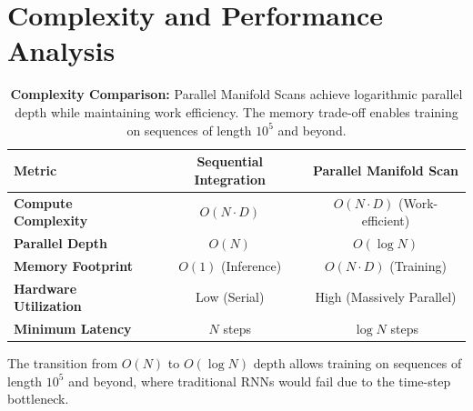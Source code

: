 \documentclass[12pt,a4paper]{article}
\begin{document}
\section{Complexity and Performance Analysis}

\begin{table}[htbp]
\centering
\begin{tabular}{@{}lcc@{}}
\toprule
\textbf{Metric} & \textbf{Sequential Integration} & \textbf{Parallel Manifold Scan} \\
\midrule
\textbf{Compute Complexity} & $O(N \cdot D)$ & $O(N \cdot D)$ (Work-efficient) \\
\textbf{Parallel Depth} & $O(N)$ & $O(\log N)$ \\
\textbf{Memory Footprint} & $O(1)$ (Inference) & $O(N \cdot D)$ (Training) \\
\textbf{Hardware Utilization} & Low (Serial) & High (Massively Parallel) \\
\textbf{Minimum Latency} & $N$ steps & $\log N$ steps \\
\bottomrule
\end{tabular}
\caption{\textbf{Complexity Comparison:} Parallel Manifold Scans achieve 
         logarithmic parallel depth while maintaining work efficiency. 
         The memory trade-off enables training on sequences of length 
         $10^5$ and beyond.}
\label{tab:complexity}
\end{table}

The transition from $O(N)$ to $O(\log N)$ depth allows training on sequences of length $10^5$ and beyond, where traditional RNNs would fail due to the time-step bottleneck.
\end{document}
